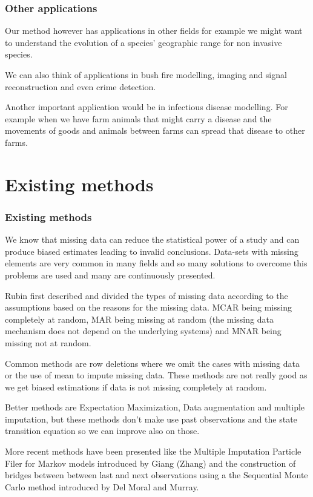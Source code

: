 \documentclass[9pt, xcolor={dvipsnames,svgnames,table}]{beamer}
\begin{document}
\begin{frame}
\frametitle{Other applications}
Our method however has applications in other fields for example we might want to understand the evolution of a species’ geographic range for non invasive species. 
    
We can also think of applications in bush fire modelling, imaging and signal reconstruction and even crime detection. 

Another important application would be in infectious disease modelling. For example when we have farm animals that might carry a disease and the movements of goods and animals between farms can spread that disease to other farms.
\end{frame}





\section{Existing methods}

\begin{frame}
\frametitle{Existing methods}
 We know that missing data can reduce the statistical power of a study and can produce biased estimates leading to invalid conclusions. Data-sets with missing elements are very common in many fields and so many solutions to overcome this problems are used and many are continuously presented.
 
 Rubin first described and divided the types of missing data according to the assumptions based on the reasons for the missing data. MCAR being missing completely at random, MAR being missing at random (the missing data mechanism does not depend on the underlying systems) and MNAR being missing not at random.
 
Common methods are row deletions where we omit the cases with missing data or the use of mean to impute missing data. These methods are not really good as we get biased estimations if data is not missing completely at random.
        
Better methods are Expectation Maximization, Data augmentation and multiple imputation, but these methods don't make use past observations and the state transition equation so we can improve also on those.

More recent methods have been presented like the Multiple Imputation Particle Filer for Markov models introduced by Giang (Zhang) and the construction of bridges between between last and next observations using a the Sequential Monte Carlo method introduced by Del Moral and Murray.
\end{frame}
\end{document}
